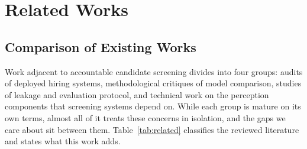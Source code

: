 \documentclass[manuscript,screen,review=false]{acmart}
\begin{document}
\section{Related Works}
\label{sec:related}

\subsection{Comparison of Existing Works}

Work adjacent to accountable candidate screening divides into four groups: audits of deployed hiring systems, methodological critiques of model comparison, studies of leakage and evaluation protocol, and technical work on the perception components that screening systems depend on. While each group is mature on its own terms, almost all of it treats these concerns in isolation, and the gaps we care about sit between them.
Table~\ref{tab:related} classifies the reviewed literature and states what this
work adds.
\end{document}
